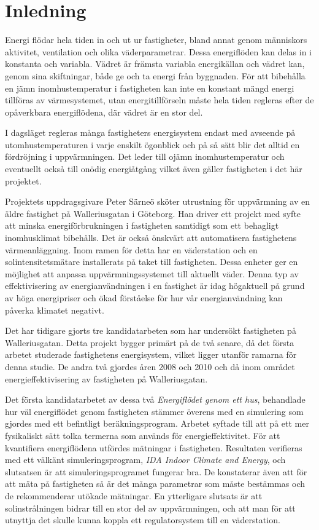 \chapter{Inledning}

Energi flödar hela tiden in och ut ur fastigheter, bland annat genom människors aktivitet, ventilation och olika väderparametrar. Dessa energiflöden kan delas in i konstanta och variabla. Vädret är främsta variabla energikällan och vädret kan, genom sina skiftningar, både ge och ta energi från byggnaden. För att bibehålla en jämn inomhustemperatur i fastigheten kan inte en konstant mängd energi tillföras av värmesystemet, utan energitillförseln måste hela tiden regleras efter de opåverkbara energiflödena, där vädret är en stor del.

I dagsläget regleras många fastigheters energisystem endast med avseende på utomhustemperaturen i varje enskilt ögonblick och på så sätt blir det alltid en fördröjning i uppvärmningen. Det leder till ojämn inomhustemperatur och eventuellt också till onödig energiåtgång vilket även gäller fastigheten i det här projektet.

Projektets uppdragsgivare Peter Särneö sköter utrustning för uppvärmning av en äldre fastighet på Walleriusgatan i Göteborg. Han driver ett projekt med syfte att minska energiförbrukningen i fastigheten samtidigt som ett behagligt inomhusklimat bibehålls. Det är också önskvärt att automatisera fastighetens värmeanläggning. Inom ramen för detta har en väderstation och en solintensitetsmätare installerats på taket till fastigheten. Dessa enheter ger en möjlighet att anpassa uppvärmningssystemet till aktuellt  väder. Denna typ av effektivisering av energianvändningen i en fastighet är idag högaktuell på grund av höga energipriser och ökad förståelse för hur vår energianvändning kan påverka klimatet negativt.

Det har tidigare gjorts tre kandidatarbeten som har undersökt fastigheten på Walleriusgatan. Detta projekt bygger primärt på de två senare, då det första arbetet studerade fastighetens energisystem, vilket ligger utanför ramarna för denna studie. De andra två gjordes åren 2008 och 2010 och då inom området energieffektivisering av fastigheten på Walleriusgatan. 

Det första kandidatarbetet av dessa två \textit{Energiflödet genom ett hus}\cite{kandidatarbete2008},
behandlade hur väl energiflödet genom fastigheten stämmer
överens med en simulering som gjordes med ett befintligt beräkningsprogram. Arbetet syftade
till att på ett mer fysikaliskt sätt tolka termerna som används för
energieffektivitet. För att kvantifiera energiflödena utfördes mätningar i
fastigheten. Resultaten verifieras med ett välkänt simuleringsprogram,
\emph{IDA Indoor Climate and Energy}, och slutsatsen är att simuleringsprogramet fungerar bra.
De konstaterar även att för att mäta på fastigheten så är det många parametrar som
måste bestämmas och de rekommenderar utökade mätningar.
 En ytterligare slutsats är att solinstrålningen bidrar till en stor del av
uppvärmningen, och att man för att utnyttja det skulle kunna koppla ett
regulatorsystem till en väderstation.

